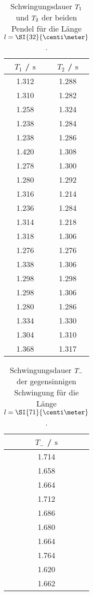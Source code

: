 \begin{table}
    \centering
    \caption{Schwingungsdauer $\protect T_{1}$ und $\protect T_{2}$ der beiden Pendel für die Länge $\protect l = \SI{32}{\centi\meter}$.}
    \label{tab:t1t2_32}
    \begin{tabular}{c |c}
        \toprule
        $T_{1}$ / $\si{\second}$  & $T_{2}$ / $\si{\second}$ \\
        \midrule
        1.312   &   1.288 \\ 
        1.310    &   1.282 \\ 
        1.258   &   1.324 \\ 
        1.238   &   1.284 \\ 
        1.238   &   1.286 \\ 
        1.420    &   1.308 \\ 
        1.278   &   1.300   \\ 
        1.280    &   1.292 \\ 
        1.316   &   1.214 \\ 
        1.236   &   1.284 \\ 
        1.314   &   1.218 \\ 
        1.318   &   1.306 \\ 
        1.276   &   1.276 \\ 
        1.338   &   1.306 \\ 
        1.298   &   1.298 \\ 
        1.298   &   1.306 \\ 
        1.280    &   1.286 \\ 
        1.334   &   1.330  \\ 
        1.304   &   1.310  \\ 
        1.368   &   1.317 \\ 
        \bottomrule
    \end{tabular}
\end{table}

\begin{table}
    \centering
    \caption{Schwingungsdauer $\protect T_{-}$ der gegensinnigen Schwingung \hspace{\textwidth}
    für die Länge $\protect l = \SI{71}{\centi\meter}$.}
    \label{tab:t-_71}
    \begin{tabular}{c}
        \toprule
        $T_{-}$ / $\si{\second}$ \\
        \midrule
        1.714  \\
        1.658  \\
        1.664  \\
        1.712  \\
        1.686  \\
        1.680  \\ 
        1.664  \\
        1.764  \\
        1.620  \\ 
        1.662  \\
        \bottomrule
    \end{tabular}
\end{table}

